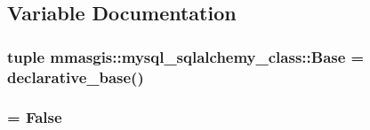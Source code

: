 \subsection{Variable Documentation}
\hypertarget{namespacemmasgis_1_1mysql__sqlalchemy__class_a81c204f68ef6032bbaf3af0368dfb6e8}{
\subsubsection[{Base}]{\setlength{\rightskip}{0pt plus 5cm}tuple {\bf mmasgis::mysql\_\-sqlalchemy\_\-class::Base} = declarative\_\-base()}}
\label{namespacemmasgis_1_1mysql__sqlalchemy__class_a81c204f68ef6032bbaf3af0368dfb6e8}
\hypertarget{namespacemmasgis_1_1mysql__sqlalchemy__class_a34963431877e166edc5590b79a319397}{
\subsubsection[{echo}]{ = False}}
\label{namespacemmasgis_1_1mysql__sqlalchemy__class_a34963431877e166edc5590b79a319397}
